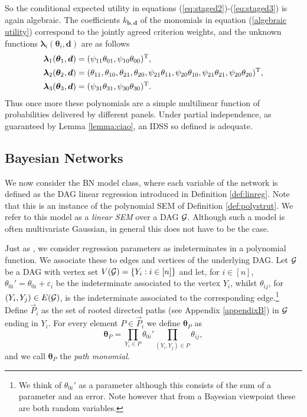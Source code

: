 So the conditional expected utility in equations (\ref{eq:staged2})-(\ref{eq:staged3}) is again algebraic. The coefficients $k_{\bm{b},\bm{d}}$ of the monomials in equation (\ref{algebraic utility}) correspond to the jointly agreed criterion weights, and the unknown functions $\bm{\lambda}_{i}(\bm{\theta}_i,\bm{d})$ are as follows 
\begin{align*}
\bm{\lambda}_1(\bm{\theta}_1,\bm{d})&=(\psi_{11}\theta_{01},\psi_{10}\theta_{00})^{\textnormal{T}},\\
\bm{\lambda}_2(\bm{\theta}_2,\bm{d})&=(\theta_{11},\theta_{10},\theta_{21},\theta_{20},\psi_{21}\theta_{11},\psi_{20}\theta_{10},\psi_{21}\theta_{21},\psi_{20}\theta_{20})^{\textnormal{T}},\\
\bm{\lambda}_3(\bm{\theta}_3,\bm{d})&=(\psi_{31}\theta_{31},\psi_{30}\theta_{30})^{\textnormal{T}}.
\end{align*}
Thus once more these polynomials are a simple multilinear function of probabilities delivered by different panels. Under partial independence, as guaranteed by  Lemma \ref{lemma:ciao}, an IDSS so defined is adequate. 
 
\subsection{Bayesian Networks}
\label{sec:bn1}

We now consider the BN model class, where each variable of the network is defined as the DAG linear regression introduced in  Definition \ref{def:linreg}. Note that this is an instance of the polynomial SEM of Definition \ref{def:polystrut}. We refer to this model as a \textit{linear SEM} over a DAG $\mathcal{G}$.  Although such a model is often multivariate Gaussian, in general this does not have to be the case.

Just as \citet{Sullivant2008}, we consider regression parameters as indeterminates in a polynomial function. We associate these to edges and vertices of the underlying DAG. Let $\mathcal{G}$ be a DAG with vertex set $V(\mathcal{G})=\{Y_i:i\in[n]\}$ and let, for $i\in[n]$, $\theta_{0i}'=\theta_{0i}+\varepsilon_{i}$ be the indeterminate associated to the vertex $Y_i$, whilst $\theta_{ij}$, for $(Y_i,Y_j)\in E(\mathcal{G})$, is the indeterminate associated to the corresponding edge.\footnote{We think of $\theta_{0i}'$ as a parameter although this consists of the sum of a parameter and an error. Note however that from a Bayesian viewpoint these are  both random variables.} Define $\vec{P}_i$ as the set of rooted directed paths (see Appendix \ref{appendixB}) in $\mathcal{G}$ ending in $Y_i$. For every element $P\in\vec{P}_i$ we define $\bm{\theta}_P$ as
 \begin{equation*}
 \bm{\theta}_P=\prod_{Y_i\in P}\theta_{0i}'\prod_{(Y_i,Y_j)\in P}\theta_{ij},
 \end{equation*}
and we call $\bm{\theta}_{P}$ the \textit{path monomial}.

